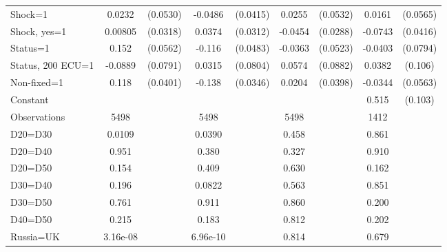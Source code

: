 \begin{tabular}{l|cccccc|cc}
Shock=1         &   0.0232         & (0.0530)&  -0.0486         & (0.0415)&   0.0255         & (0.0532)&   0.0161         & (0.0565)\\
Shock, yes=1    &  0.00805         & (0.0318)&   0.0374         & (0.0312)&  -0.0454         & (0.0288)&  -0.0743\sym{*}  & (0.0416)\\
Status=1        &    0.152\sym{***}& (0.0562)&   -0.116\sym{**} & (0.0483)&  -0.0363         & (0.0523)&  -0.0403         & (0.0794)\\
Status, 200 ECU=1&  -0.0889         & (0.0791)&   0.0315         & (0.0804)&   0.0574         & (0.0882)&   0.0382         &  (0.106)\\
Non-fixed=1     &    0.118\sym{***}& (0.0401)&   -0.138\sym{***}& (0.0346)&   0.0204         & (0.0398)&  -0.0344         & (0.0563)\\
Constant        &                  &         &                  &         &                  &         &    0.515\sym{***}&  (0.103)\\
\hline
Observations    &     5498         &         &     5498         &         &     5498         &         &     1412         &         \\
D20=D30         &   0.0109         &         &   0.0390         &         &    0.458         &         &    0.861         &         \\
D20=D40         &    0.951         &         &    0.380         &         &    0.327         &         &    0.910         &         \\
D20=D50         &    0.154         &         &    0.409         &         &    0.630         &         &    0.162         &         \\
D30=D40         &    0.196         &         &   0.0822         &         &    0.563         &         &    0.851         &         \\
D30=D50         &    0.761         &         &    0.911         &         &    0.860         &         &    0.200         &         \\
D40=D50         &    0.215         &         &    0.183         &         &    0.812         &         &    0.202         &         \\
Russia=UK       & 3.16e-08         &         & 6.96e-10         &         &    0.814         &         &    0.679         &         \\
\hline\hline

\end{tabular}
